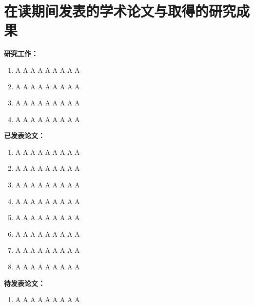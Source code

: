 \chapter{在读期间发表的学术论文与取得的研究成果}

\noindent\textbf{研究工作：}

\begin{enumerate}

\item A A A A A A A A A
\item A A A A A A A A A
\item A A A A A A A A A
\item A A A A A A A A A

\end{enumerate}


\noindent\textbf{已发表论文：}

\begin{enumerate}

\item A A A A A A A A A 
\item A A A A A A A A A
\item A A A A A A A A A
\item A A A A A A A A A
\item A A A A A A A A A
\item A A A A A A A A A
\item A A A A A A A A A
\item A A A A A A A A A

\end{enumerate}

\vskip 1cm

\noindent\textbf{待发表论文：}

\begin{enumerate}

\item A A A A A A A A A

\end{enumerate} 